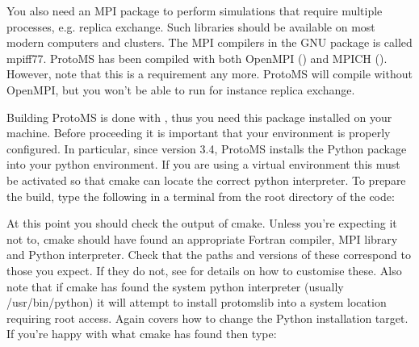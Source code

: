 \documentclass[letterpaper,10pt,english]{sphinxmanual}
\begin{document}
You also need an MPI package to perform simulations that require multiple processes, e.g. replica exchange. Such libraries should be available on most modern computers and clusters. The MPI compilers in the GNU package is called mpiff77. ProtoMS has been compiled with both OpenMPI () and MPICH (). However, note that this is  a requirement any more. ProtoMS will compile without OpenMPI, but you won’t be able to run for instance replica exchange.

Building ProtoMS is done with  , thus you need this package installed on your machine. Before proceeding it is important that your environment is properly configured. In particular, since version 3.4, ProtoMS installs the Python package  into your python environment. If you are using a virtual environment this must be activated so that cmake can locate the correct python interpreter. To prepare the build, type the following in a terminal from the root directory of the code:

%
\begin{sphinxVerbatim}[commandchars=\\\{\}]
 
 
 
\end{sphinxVerbatim}

At this point you should check the output of cmake. Unless you’re expecting it not to, cmake should have found an appropriate Fortran compiler,  MPI library and Python interpreter. Check that the paths and versions of these correspond to those you expect. If they do not, see {\hyperref[\detokenize{compilation:custom-build}]{}} for details on how to customise these. Also note that if cmake has found the system python interpreter (usually /usr/bin/python) it will attempt to install protomslib into a system location requiring root access. Again {\hyperref[\detokenize{compilation:custom-build}]{}} covers how to change the Python installation target. If you’re happy with what cmake has found then type:

%
\begin{sphinxVerbatim}[commandchars=\\\{\}]
 
\end{sphinxVerbatim}
\end{document}
